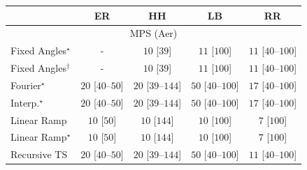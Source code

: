 \begin{tabular}{l|cccc|}
\toprule
            & ER & HH & LB & RR \\
\midrule
\multicolumn{5}{c}{\rule{0pt}{8pt}MPS (Aer)} \\
\midrule
Fixed Angles$^\star$ & {\cellcolor[HTML]{000000}} \color[HTML]{F1F1F1} {\cellcolor{white}} \color{black} - & {\cellcolor[HTML]{F7FCF5}} \color[HTML]{000000} $10$ [$39$] & {\cellcolor[HTML]{F6FCF4}} \color[HTML]{000000} $11$ [$100$] & {\cellcolor[HTML]{F6FCF4}} \color[HTML]{000000} $11$ [$40$--$100$] \\
Fixed Angles$^\dagger$ & {\cellcolor[HTML]{000000}} \color[HTML]{F1F1F1} {\cellcolor{white}} \color{black} - & {\cellcolor[HTML]{F7FCF5}} \color[HTML]{000000} $10$ [$39$] & {\cellcolor[HTML]{F6FCF4}} \color[HTML]{000000} $11$ [$100$] & {\cellcolor[HTML]{F6FCF4}} \color[HTML]{000000} $11$ [$40$--$100$] \\
Fourier$^\star$ & {\cellcolor[HTML]{F5FBF2}} \color[HTML]{000000} $20$ [$40$--$50$] & {\cellcolor[HTML]{F5FBF2}} \color[HTML]{000000} $20$ [$39$--$144$] & {\cellcolor[HTML]{EFF9EC}} \color[HTML]{000000} $50$ [$40$--$100$] & {\cellcolor[HTML]{F5FBF3}} \color[HTML]{000000} $17$ [$40$--$100$] \\
Interp.$^\star$ & {\cellcolor[HTML]{F5FBF2}} \color[HTML]{000000} $20$ [$40$--$50$] & {\cellcolor[HTML]{F5FBF2}} \color[HTML]{000000} $20$ [$39$--$144$] & {\cellcolor[HTML]{EFF9EC}} \color[HTML]{000000} $50$ [$40$--$100$] & {\cellcolor[HTML]{F5FBF3}} \color[HTML]{000000} $17$ [$40$--$100$] \\
Linear Ramp & {\cellcolor[HTML]{F7FCF5}} \color[HTML]{000000} $10$ [$50$] & {\cellcolor[HTML]{F7FCF5}} \color[HTML]{000000} $10$ [$144$] & {\cellcolor[HTML]{F7FCF5}} \color[HTML]{000000} $10$ [$100$] & {\cellcolor[HTML]{F7FCF5}} \color[HTML]{000000} $7$ [$100$] \\
Linear Ramp$^\star$ & {\cellcolor[HTML]{F7FCF5}} \color[HTML]{000000} $10$ [$50$] & {\cellcolor[HTML]{F7FCF5}} \color[HTML]{000000} $10$ [$144$] & {\cellcolor[HTML]{F7FCF5}} \color[HTML]{000000} $10$ [$100$] & {\cellcolor[HTML]{F7FCF5}} \color[HTML]{000000} $7$ [$100$] \\
Recursive TS & {\cellcolor[HTML]{F5FBF2}} \color[HTML]{000000} $20$ [$40$--$50$] & {\cellcolor[HTML]{F5FBF2}} \color[HTML]{000000} $20$ [$39$--$144$] & {\cellcolor[HTML]{EFF9EC}} \color[HTML]{000000} $50$ [$40$--$100$] & {\cellcolor[HTML]{F6FCF4}} \color[HTML]{000000} $11$ [$40$--$100$] \\

\end{tabular}
